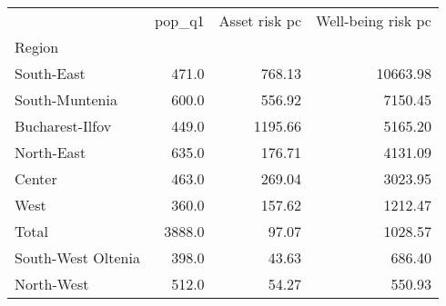\begin{tabular}{lrrr}
\toprule
{} &  pop\_q1 &  Asset risk pc &  Well-being risk pc \\
Region             &         &                &                     \\
\midrule
South-East         &   471.0 &         768.13 &            10663.98 \\
South-Muntenia     &   600.0 &         556.92 &             7150.45 \\
Bucharest-Ilfov    &   449.0 &        1195.66 &             5165.20 \\
North-East         &   635.0 &         176.71 &             4131.09 \\
Center             &   463.0 &         269.04 &             3023.95 \\
West               &   360.0 &         157.62 &             1212.47 \\
Total              &  3888.0 &          97.07 &             1028.57 \\
South-West Oltenia &   398.0 &          43.63 &              686.40 \\
North-West         &   512.0 &          54.27 &              550.93 \\
\bottomrule
\end{tabular}
